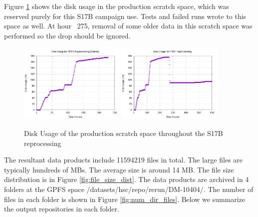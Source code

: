 \documentclass[DM,authoryear,toc]{lsstdoc}
\begin{document}
Figure \ref{fig:df} shows the disk usage in the production scratch space, which was reserved purely for this S17B campaign use. Tests and failed runs wrote to this space as well.  At hour ~275, removal of some older data in this scratch space was performed so the drop should be ignored.
\begin{figure}[htbp]
        \begin{center}
                 \includegraphics[width=0.45\textwidth]{figures/df_focus}
                 \includegraphics[width=0.45\textwidth]{figures/df}
                 \caption{Disk Usage of the production scratch space throughout the S17B reprocessing}
                 \label{fig:df}
        \end{center}
\end{figure}

The resultant data products include 11594219 files in total.
The large files are typically hundreds of MBs.  The average size is around 14 MB. The file size distribution is in Figure \ref{fig:file_size_dist}.
The data products are archived in 4 folders at the GPFS space /datasets/hsc/repo/rerun/DM-10404/.
The number of files in each folder is shown in Figure \ref{fig:num_dir_files}.
Below we summarize the output repositories in each folder.
\end{document}
